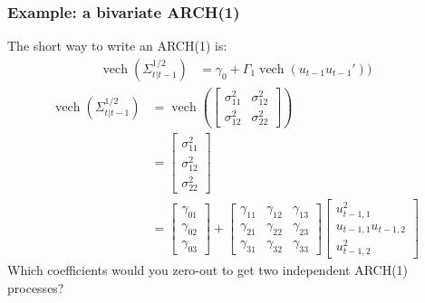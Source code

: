 \documentclass{beamer}
\begin{document}
\begin{frame}
\frametitle{Example: a bivariate ARCH(1)}
The short way to write an ARCH(1) is:
\begin{align*}
\operatorname{vech}\left( \Sigma_{t|t-1}^{1/2} \right) &= \gamma_0 + \Gamma_1 \operatorname{vech}(u_{t-1} u_{t-1}'))
\end{align*}
\begin{align*}
\operatorname{vech}\left( \Sigma_{t|t-1}^{1/2} \right) &= 
\operatorname{vech}\left( \left[ \begin{array}{cc}
\sigma^2_{11} & \sigma^2_{12} \\
\sigma^2_{12} & \sigma^2_{22} 
\end{array}\right]\right) \\
&= \left[ \begin{array}{c}
\sigma^2_{11} \\
\sigma^2_{12} \\
\sigma^2_{22}
\end{array}\right] \\
&= \left[ \begin{array}{c}
\gamma_{01} \\
\gamma_{02} \\
\gamma_{03}
\end{array}\right] + 
\left[\begin{array}{ccc}
\gamma_{11} & \gamma_{12} & \gamma_{13}\\
\gamma_{21} & \gamma_{22} & \gamma_{23}\\
\gamma_{31} & \gamma_{32} & \gamma_{33}
\end{array}\right]
\left[ \begin{array}{c}
u_{t-1,1}^2 \\
u_{t-1,1}u_{t-1,2} \\
u_{t-1,2}^2
\end{array}\right]
\end{align*}
\pause
Which coefficients would you zero-out to get two independent ARCH(1) processes?


\end{frame}


\end{document}
